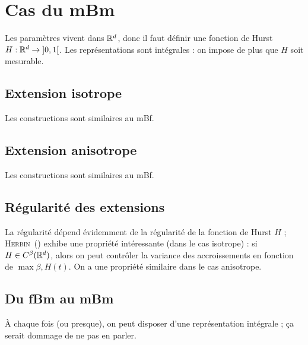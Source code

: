\section{Cas du mBm}
Les paramètres vivent dans $\mathbb{R}^d$, donc il faut définir une fonction
de Hurst $H:\mathbb{R}^d \to \left]0,1\right[$. Les représentations sont intégrales
: on impose de plus que $H$ soit mesurable.
\subsection{Extension isotrope}
Les constructions sont similaires au mBf.
\subsection{Extension anisotrope}
Les constructions sont similaires au mBf.
\subsection{Régularité des extensions}
La régularité dépend évidemment de la régularité de la fonction de
Hurst $H$ ; \textsc{Herbin}~(\cite{herbin2002}) exhibe une propriété
intéressante (dans le cas isotrope) : si $H \in C^\beta(\mathbb{R}^d)$, alors
on peut contrôler la variance des accroissements en fonction de
$\max{\beta, H(t)}$. On a une propriété similaire dans le cas
anisotrope.

\subsection{Du fBm au mBm}
\vspace{0.2em}
\begin{alert}
  À chaque fois (ou presque), on peut disposer d'une représentation
  intégrale ; ça serait dommage de ne pas en parler.
\end{alert}